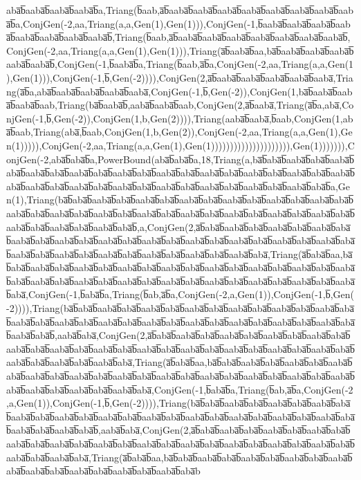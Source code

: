 aba̅b̅aaba̅b̅aaba̅b̅aaba̅b̅a,Triang(b̅aab,a̅b̅aaba̅b̅aaba̅b̅aaba̅b̅aaba̅b̅aaba̅b̅aaba̅b̅aaba̅b̅aaba̅b̅a,ConjGen(-2,aa,Triang(a,a,Gen(1),Gen(1))),ConjGen(-1,b̅aaba̅b̅aaba̅b̅aaba̅b̅aaba̅b̅aaba̅b̅aaba̅b̅aaba̅b̅aaba̅b̅,Triang(b̅aab,a̅b̅aaba̅b̅aaba̅b̅aaba̅b̅aaba̅b̅aaba̅b̅aaba̅b̅aaba̅b̅,ConjGen(-2,aa,Triang(a,a,Gen(1),Gen(1))),Triang(a̅b̅aaba̅b̅aa,ba̅b̅aaba̅b̅aaba̅b̅aaba̅b̅aaba̅b̅aaba̅b̅,ConjGen(-1,b̅aaba̅b̅a,Triang(b̅aab,a̅b̅a,ConjGen(-2,aa,Triang(a,a,Gen(1),Gen(1))),ConjGen(-1,b̅,Gen(-2)))),ConjGen(2,a̅b̅aaba̅b̅aaba̅b̅aaba̅b̅aaba̅b̅aaba̅,Triang(a̅b̅a,aba̅b̅aaba̅b̅aaba̅b̅aaba̅b̅aaba̅,ConjGen(-1,b̅,Gen(-2)),ConjGen(1,ba̅b̅aaba̅b̅aaba̅b̅aaba̅b̅aab,Triang(ba̅b̅aaba̅b̅,aaba̅b̅aaba̅b̅aab,ConjGen(2,a̅b̅aaba̅,Triang(a̅b̅a,aba̅,ConjGen(-1,b̅,Gen(-2)),ConjGen(1,b,Gen(2)))),Triang(aaba̅b̅aaba̅,b̅aab,ConjGen(1,aba̅b̅aab,Triang(aba̅,b̅aab,ConjGen(1,b,Gen(2)),ConjGen(-2,aa,Triang(a,a,Gen(1),Gen(1))))),ConjGen(-2,aa,Triang(a,a,Gen(1),Gen(1))))))))))))))))))))),Gen(1))))))),ConjGen(-2,aba̅b̅aba̅b̅a,PowerBound(aba̅b̅aba̅b̅a,18,Triang(a,ba̅b̅aba̅b̅aaba̅b̅aba̅b̅aaba̅b̅aba̅b̅aaba̅b̅aba̅b̅aaba̅b̅aba̅b̅aaba̅b̅aba̅b̅aaba̅b̅aba̅b̅aaba̅b̅aba̅b̅aaba̅b̅aba̅b̅aaba̅b̅aba̅b̅aaba̅b̅aba̅b̅aaba̅b̅aba̅b̅aaba̅b̅aba̅b̅aaba̅b̅aba̅b̅aaba̅b̅aba̅b̅aaba̅b̅aba̅b̅aaba̅b̅aba̅b̅aaba̅b̅aba̅b̅a,Gen(1),Triang(ba̅b̅aba̅b̅aaba̅b̅aba̅b̅aaba̅b̅aba̅b̅aaba̅b̅aba̅b̅aaba̅b̅aba̅b̅aaba̅b̅aba̅b̅aaba̅b̅aba̅b̅aaba̅b̅aba̅b̅aaba̅b̅aba̅b̅aaba̅b̅aba̅b̅aaba̅b̅aba̅b̅aaba̅b̅aba̅b̅aaba̅b̅aba̅b̅aaba̅b̅aba̅b̅aaba̅b̅aba̅b̅aaba̅b̅aba̅b̅aaba̅b̅aba̅b̅aaba̅b̅aba̅b̅,a,ConjGen(2,a̅b̅aba̅b̅aaba̅b̅aba̅b̅aaba̅b̅aba̅b̅aaba̅b̅aba̅b̅aaba̅b̅aba̅b̅aaba̅b̅aba̅b̅aaba̅b̅aba̅b̅aaba̅b̅aba̅b̅aaba̅b̅aba̅b̅aaba̅b̅aba̅b̅aaba̅b̅aba̅b̅aaba̅b̅aba̅b̅aaba̅b̅aba̅b̅aaba̅b̅aba̅b̅aaba̅b̅aba̅b̅aaba̅b̅aba̅b̅aaba̅b̅aba̅b̅aaba̅b̅aba̅,Triang(a̅b̅aba̅b̅aa,ba̅b̅aba̅b̅aaba̅b̅aba̅b̅aaba̅b̅aba̅b̅aaba̅b̅aba̅b̅aaba̅b̅aba̅b̅aaba̅b̅aba̅b̅aaba̅b̅aba̅b̅aaba̅b̅aba̅b̅aaba̅b̅aba̅b̅aaba̅b̅aba̅b̅aaba̅b̅aba̅b̅aaba̅b̅aba̅b̅aaba̅b̅aba̅b̅aaba̅b̅aba̅b̅aaba̅b̅aba̅b̅aaba̅b̅aba̅b̅aaba̅b̅aba̅,ConjGen(-1,b̅aba̅b̅a,Triang(b̅ab,a̅b̅a,ConjGen(-2,a,Gen(1)),ConjGen(-1,b̅,Gen(-2)))),Triang(ba̅b̅aba̅b̅aaba̅b̅aba̅b̅aaba̅b̅aba̅b̅aaba̅b̅aba̅b̅aaba̅b̅aba̅b̅aaba̅b̅aba̅b̅aaba̅b̅aba̅b̅aaba̅b̅aba̅b̅aaba̅b̅aba̅b̅aaba̅b̅aba̅b̅aaba̅b̅aba̅b̅aaba̅b̅aba̅b̅aaba̅b̅aba̅b̅aaba̅b̅aba̅b̅aaba̅b̅aba̅b̅aaba̅b̅aba̅b̅,aaba̅b̅aba̅,ConjGen(2,a̅b̅aba̅b̅aaba̅b̅aba̅b̅aaba̅b̅aba̅b̅aaba̅b̅aba̅b̅aaba̅b̅aba̅b̅aaba̅b̅aba̅b̅aaba̅b̅aba̅b̅aaba̅b̅aba̅b̅aaba̅b̅aba̅b̅aaba̅b̅aba̅b̅aaba̅b̅aba̅b̅aaba̅b̅aba̅b̅aaba̅b̅aba̅b̅aaba̅b̅aba̅b̅aaba̅b̅aba̅b̅aaba̅b̅aba̅,Triang(a̅b̅aba̅b̅aa,ba̅b̅aba̅b̅aaba̅b̅aba̅b̅aaba̅b̅aba̅b̅aaba̅b̅aba̅b̅aaba̅b̅aba̅b̅aaba̅b̅aba̅b̅aaba̅b̅aba̅b̅aaba̅b̅aba̅b̅aaba̅b̅aba̅b̅aaba̅b̅aba̅b̅aaba̅b̅aba̅b̅aaba̅b̅aba̅b̅aaba̅b̅aba̅b̅aaba̅b̅aba̅b̅aaba̅b̅aba̅,ConjGen(-1,b̅aba̅b̅a,Triang(b̅ab,a̅b̅a,ConjGen(-2,a,Gen(1)),ConjGen(-1,b̅,Gen(-2)))),Triang(ba̅b̅aba̅b̅aaba̅b̅aba̅b̅aaba̅b̅aba̅b̅aaba̅b̅aba̅b̅aaba̅b̅aba̅b̅aaba̅b̅aba̅b̅aaba̅b̅aba̅b̅aaba̅b̅aba̅b̅aaba̅b̅aba̅b̅aaba̅b̅aba̅b̅aaba̅b̅aba̅b̅aaba̅b̅aba̅b̅aaba̅b̅aba̅b̅aaba̅b̅aba̅b̅,aaba̅b̅aba̅,ConjGen(2,a̅b̅aba̅b̅aaba̅b̅aba̅b̅aaba̅b̅aba̅b̅aaba̅b̅aba̅b̅aaba̅b̅aba̅b̅aaba̅b̅aba̅b̅aaba̅b̅aba̅b̅aaba̅b̅aba̅b̅aaba̅b̅aba̅b̅aaba̅b̅aba̅b̅aaba̅b̅aba̅b̅aaba̅b̅aba̅b̅aaba̅b̅aba̅b̅aaba̅b̅aba̅,Triang(a̅b̅aba̅b̅aa,ba̅b̅aba̅b̅aaba̅b̅aba̅b̅aaba̅b̅aba̅b̅aaba̅b̅aba̅b̅aaba̅b̅aba̅b̅aaba̅b̅aba̅b̅aaba̅b̅aba̅b̅aaba̅b̅aba̅b̅aaba̅b̅aba̅b